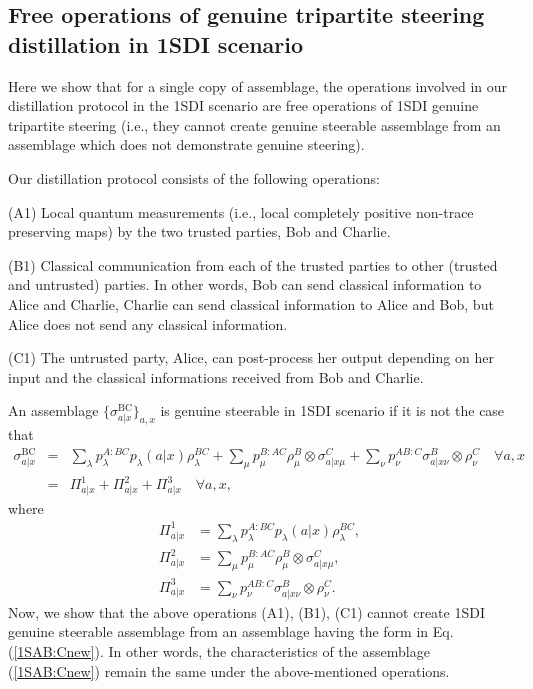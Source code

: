 \documentclass[reprint,superscriptaddress,nofootinbib,amsmath,amssymb,aps,pra,longbibliography]{revtex4-1}
\begin{document}
\begin{widetext}
 \section{Free operations of genuine tripartite steering distillation in 1SDI scenario}\label{app1}
 Here we  show that for a single copy of assemblage, the operations involved in our distillation protocol in the 1SDI scenario are free operations of 1SDI genuine tripartite steering (i.e., they cannot create genuine steerable assemblage from an assemblage which does not demonstrate genuine steering). 
 
 Our distillation protocol consists of the following operations:
 
 (A1) Local quantum measurements (i.e., local completely positive non-trace preserving maps) by the two trusted parties, Bob and Charlie.
 
 (B1) Classical communication from each of the trusted parties to other (trusted and untrusted) parties. In other words, Bob can send classical information to Alice and Charlie, Charlie can send classical information to Alice and Bob, but Alice does not send any classical information.
 
 (C1) The untrusted party, Alice, can post-process her output depending on her input and the classical informations received from Bob and Charlie.
 
  An assemblage $\{ \sigma^{\text{BC}}_{a|x} \}_{a,x}$ is genuine steerable in 1SDI scenario  if it is not the case that \cite{Cavalcanti15}
\begin{eqnarray} 
	\sigma^{\text{BC}}_{a|x} &=& \sum_\lambda p_\lambda^{A:BC}p_\lambda(a|x)\rho_\lambda^{BC}
							+ \sum_\mu p_\mu^{B:AC}\rho_\mu^B\otimes \sigma_{a|x\mu}^{C} 
						        + \sum_\nu p_\nu^{AB:C} \sigma_{a|x\nu}^{B}\otimes \rho_\nu^C \quad \forall a, x \nonumber \\
						        &=& \Pi^1_{a|x} + \Pi^2_{a|x} + \Pi^3_{a|x} \quad \forall a, x,
						 \label{1SAB:Cnew} 
\end{eqnarray} 
where
\begin{align}
 \Pi^1_{a|x} &=  \sum_\lambda p_\lambda^{A:BC}p_\lambda(a|x)\rho_\lambda^{BC}, \nonumber \\  
 \Pi^2_{a|x} &=  \sum_\mu p_\mu^{B:AC}\rho_\mu^B\otimes \sigma_{a|x\mu}^{C},  \nonumber \\  
 \Pi^3_{a|x} &=  \sum_\nu p_\nu^{AB:C} \sigma_{a|x\nu}^{B}\otimes \rho_\nu^C. \nonumber 						        
\end{align}
Now, we  show that the above operations (A1), (B1), (C1) cannot create 1SDI genuine steerable assemblage from an assemblage having the form in Eq.(\ref{1SAB:Cnew}). In other words,  the characteristics of the assemblage (\ref{1SAB:Cnew}) remain the same under the above-mentioned operations.


\end{widetext}
\end{document}
